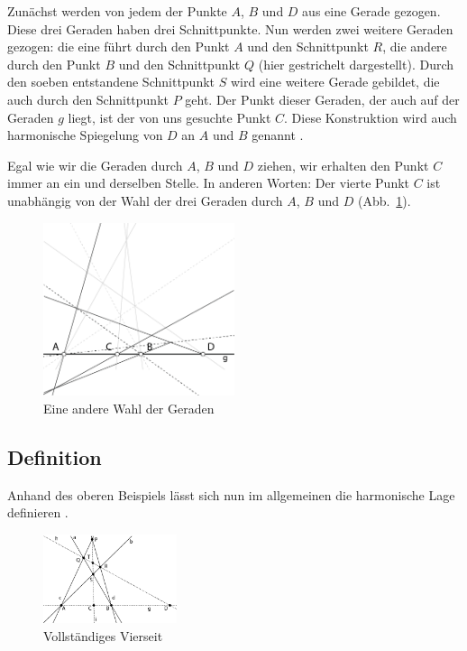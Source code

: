 \documentclass[12pt,a4paper]{article}
\begin{document}
Zunächst werden von jedem der Punkte $A$, $B$ und $D$ aus eine Gerade gezogen. Diese drei Geraden haben drei Schnittpunkte. Nun werden zwei weitere Geraden gezogen: die eine führt durch den Punkt $A$ und den Schnittpunkt $R$, die andere durch den Punkt $B$ und den Schnittpunkt $Q$ (hier gestrichelt dargestellt).
\newline
\newline
Durch den soeben entstandene Schnittpunkt $S$ wird eine weitere Gerade gebildet, die auch durch den Schnittpunkt $P$ geht. Der Punkt dieser Geraden, der auch auf der Geraden $g$ liegt, ist der von uns gesuchte Punkt $C$. Diese Konstruktion wird auch harmonische Spiegelung von $D$ an $A$ und $B$ genannt \citep[vgl.~][S.~34]{harmonischeLage}.

Egal wie wir die Geraden durch $A$, $B$ und $D$ ziehen, wir erhalten den Punkt $C$ immer an ein und derselben Stelle. In anderen Worten: Der vierte Punkt $C$ ist unabhängig von der Wahl der drei Geraden durch $A$, $B$ und $D$ (Abb.~\ref{fig:AndereWahl}).

\begin{figure}[htbp]
\centering
\includegraphics[width=0.5\textwidth]{Bilder/fuer_mehrere_geraden.png}
\caption{Eine andere Wahl der Geraden}
\label{fig:AndereWahl}
\end{figure}

\newpage
\subsection{Definition}
Anhand des oberen Beispiels lässt sich nun im allgemeinen die harmonische Lage definieren \citep[S.~43, 45f]{projektiveGeometrie}.

\begin{figure}
\centering
\includegraphics[width=0.35\textwidth]{Bilder/vollstaendigesVierseit.png}
\caption{Vollständiges Vierseit}
\end{figure}
\end{document}
